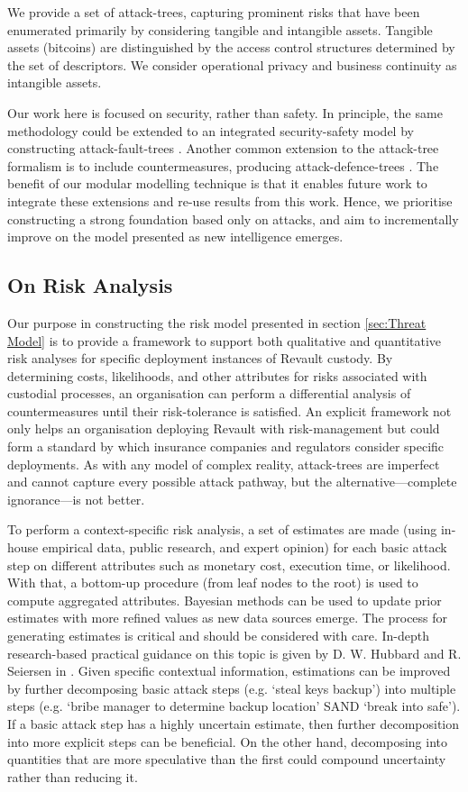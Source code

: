 \documentclass[runningheads]{llncs}
\begin{document}
We provide a set of attack-trees, capturing prominent risks that have been enumerated primarily by considering tangible and intangible assets. Tangible assets (bitcoins) are distinguished by the access control structures determined by the set of descriptors. We consider operational privacy and business continuity as intangible assets. 

Our work here is focused on security, rather than safety. In principle, the same methodology could be extended to an integrated security-safety model by constructing attack-fault-trees \cite{AFTrees}. Another common extension to the attack-tree formalism is to include countermeasures, producing attack-defence-trees \cite{FoundationsADTrees,ADTreeValue}. The benefit of our modular modelling technique is that it enables future work to integrate these extensions and re-use results from this work. Hence, we prioritise constructing a strong foundation based only on attacks, and aim to incrementally improve on the model presented as new intelligence emerges.

\subsection{On Risk Analysis}

Our purpose in constructing the risk model presented in section \ref{sec:Threat Model} is to provide a framework to support both qualitative and quantitative risk analyses for specific deployment instances of Revault custody. By determining costs, likelihoods, and other attributes for risks associated with custodial processes, an organisation can perform a differential analysis of countermeasures until their risk-tolerance is satisfied. An explicit framework not only helps an organisation deploying Revault with risk-management but could form a standard by which insurance companies and regulators consider specific deployments. As with any model of complex reality, attack-trees are imperfect and cannot capture every possible attack pathway, but the alternative---complete ignorance---is not better. 

To perform a context-specific risk analysis, a set of estimates are made (using in-house empirical data, public research, and expert opinion) for each basic attack step on different attributes such as monetary cost, execution time, or likelihood. With that, a bottom-up procedure (from leaf nodes to the root) is used to compute aggregated attributes. Bayesian methods can be used to update prior estimates with more refined values as new data sources emerge. The process for generating estimates is critical and should be considered with care. In-depth research-based practical guidance on this topic is given by D. W. Hubbard and R. Seiersen in \cite{Hubbard}.
Given specific contextual information, estimations can be improved by further decomposing basic attack steps (e.g. `steal keys backup') into multiple steps (e.g.  `bribe manager to determine backup location' SAND `break into safe'). If a basic attack step has a highly uncertain estimate, then further decomposition into more explicit steps can be beneficial. On the other hand, decomposing into quantities that are more speculative than the first could compound uncertainty rather than reducing it. 
\end{document}
